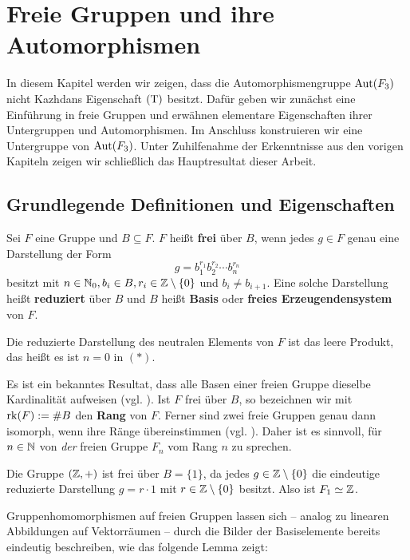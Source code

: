 \chapter{Freie Gruppen und ihre Automorphismen}
\label{cha:free_groups}
	In diesem Kapitel werden wir zeigen, dass die Automorphismengruppe $\operatorname{Aut}(F_3)$ nicht Kazhdans Eigenschaft $\operatorname{(T)}$ besitzt. Dafür geben wir zunächst eine Einführung in freie Gruppen und erwähnen elementare Eigenschaften ihrer Untergruppen und Automorphismen. Im Anschluss konstruieren wir eine Untergruppe von $\operatorname{Aut}(F_3)$. Unter Zuhilfenahme der Erkenntnisse aus den vorigen Kapiteln zeigen wir schließlich das Hauptresultat dieser Arbeit.
	
\section{Grundlegende Definitionen und Eigenschaften}
\begin{definition}
	Sei $F$ eine Gruppe und $B \subseteq F$. $F$ heißt \textbf{frei} über $B$, wenn jedes $g \in F$ genau eine Darstellung der Form
	\begin{equation}
		g = b_1^{r_1} b_2^{r_2} \cdots b_n^{r_n} \tag*{($*$)}
	\end{equation}
	besitzt mit $n \in \mathbb{N}_0, b_i \in B, r_i \in \mathbb{Z} \setminus \{0\}$ und $b_i \neq b_{i+1}$. Eine solche Darstellung heißt \textbf{reduziert} über $B$ und $B$ heißt \textbf{Basis} oder \textbf{freies Erzeugendensystem} von $F$.
\end{definition}

\begin{bemerkung}
	Die reduzierte Darstellung des neutralen Elements von $F$ ist das leere Produkt, das heißt es ist $n = 0$ in $(*)$.
\end{bemerkung}

Es ist ein bekanntes Resultat, dass alle Basen einer freien Gruppe dieselbe Kardinalität aufweisen (vgl. \cite[Theorem 3.8]{Bogopolski}). Ist $F$ frei über $B$, so bezeichnen wir mit $\operatorname{rk}(F) := \#B$ den \textbf{Rang} von $F$. Ferner sind zwei freie Gruppen genau dann isomorph, wenn ihre Ränge übereinstimmen (vgl. \cite[Kor. 3.10]{Bogopolski}). Daher ist es sinnvoll, für $n \in \mathbb{N}$ von \emph{der} freien Gruppe $F_n$ vom Rang $n$ zu sprechen.

\begin{beispiel}
	Die Gruppe $(\mathbb{Z},+)$ ist frei über $B = \{1\}$, da jedes $g \in \mathbb{Z} \setminus \{0\}$ die eindeutige reduzierte Darstellung $g = r \cdot 1$ mit $r \in \mathbb{Z} \setminus \{0\}$ besitzt. Also ist $F_1 \simeq \mathbb{Z}$.	
\end{beispiel}
\newpage
Gruppenhomomorphismen auf freien Gruppen lassen sich -- analog zu linearen Abbildungen auf Vektorräumen -- durch die Bilder der Basiselemente bereits eindeutig beschreiben, wie das folgende Lemma zeigt:

